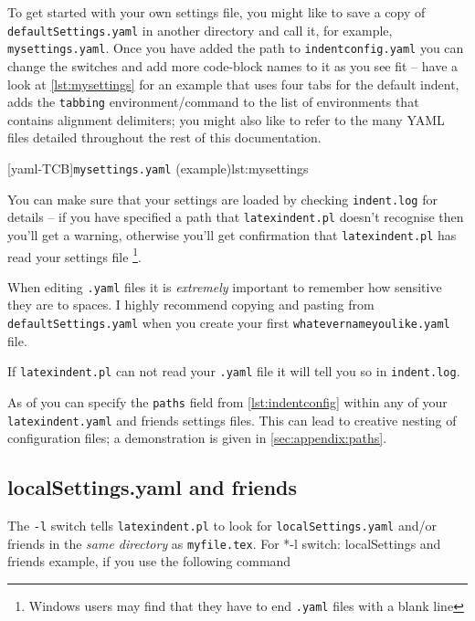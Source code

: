  To get started with your own settings file, you might like to save a copy of
 \texttt{defaultSettings.yaml} in another directory and call it, for example,
 \texttt{mysettings.yaml}. Once you have added the path to \texttt{indentconfig.yaml} you
 can change the switches and add more code-block names to it as you see fit -- have a
 look at \cref{lst:mysettings} for an example that uses four tabs for the default indent,
 adds the \texttt{tabbing} environment/command to the list of environments that contains
 alignment delimiters; you might also like to refer to the many YAML files detailed
 throughout the rest of this documentation. 

 [yaml-TCB]{\texttt{mysettings.yaml} (example)}{lst:mysettings}

 You can make sure that your settings are loaded by checking \texttt{indent.log} for
 details -- if you have specified a path that \texttt{latexindent.pl} doesn't recognise
 then you'll get a warning, otherwise you'll get confirmation that
 \texttt{latexindent.pl} has read your settings file \footnote{Windows users may find
 that they have to end \texttt{.yaml} files with a blank line}. 

 \begin{warning}
  When editing \texttt{.yaml} files it is \emph{extremely} important to remember how
  sensitive they are to spaces. I highly recommend copying and pasting from
  \texttt{defaultSettings.yaml} when you create your first
  \texttt{whatevernameyoulike.yaml} file.

  If \texttt{latexindent.pl} can not read your \texttt{.yaml} file it will tell you so in
  \texttt{indent.log}.
 \end{warning}

 As of  you can specify the
 \texttt{paths} field from \cref{lst:indentconfig} within any of your
 \texttt{latexindent.yaml} and friends settings files. This can lead to creative nesting
 of configuration files; a demonstration is given in \vref{sec:appendix:paths}.

\subsection{localSettings.yaml and friends}\label{sec:localsettings}
 The \texttt{-l} switch tells \texttt{latexindent.pl} to look for
 \texttt{localSettings.yaml} and/or friends in the \emph{same directory} as
 \texttt{myfile.tex}. For%
 *{-l
 switch: localSettings and friends} example, if you use the following command

